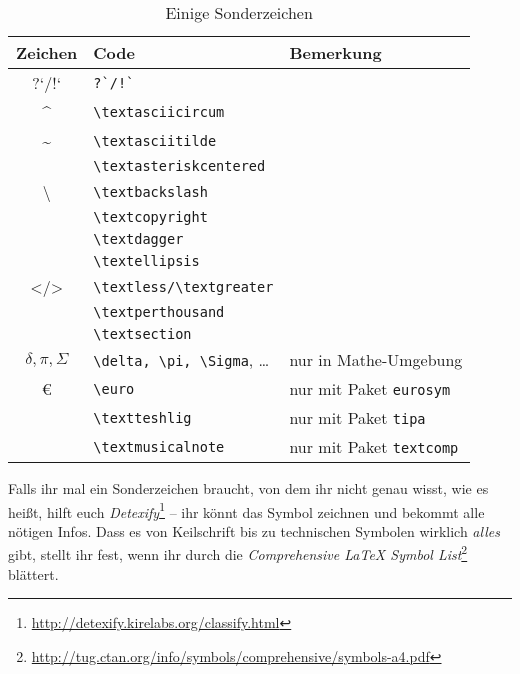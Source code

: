 \begin{table}[H]
	\center
	\begin{tabular}{cll}
		\toprule
		Zeichen & Code & Bemerkung \\
		\midrule
		?`/!` & \verb|?`/!`| & \\
		\textasciicircum & \verb|\textasciicircum| & \\
		\textasciitilde & \verb|\textasciitilde| & \\
		\textasteriskcentered & \verb|\textasteriskcentered| & \\
		\textbackslash & \verb|\textbackslash| & \\
		\textcopyright & \verb|\textcopyright| & \\
		\textdagger & \verb|\textdagger| & \\
		\textellipsis & \verb|\textellipsis| & \\
		\textless/\textgreater & \verb|\textless/\textgreater| & \\
		\textperthousand & \verb|\textperthousand| & \\
		\textsection & \verb|\textsection| & \\
		$\delta, \pi, \Sigma$ & \verb|\delta, \pi, \Sigma|, … & nur in Mathe-Umgebung \\
		\euro & \verb|\euro| & nur mit Paket \texttt{eurosym} \\
		\textteshlig & \verb|\textteshlig| & nur mit Paket \texttt{tipa} \\
		\textmusicalnote & \verb|\textmusicalnote| & nur mit Paket \texttt{textcomp} \\
		\bottomrule
	\end{tabular}
	\caption{Einige Sonderzeichen}
	\label{tbl:sonderzeichen}
\end{table}
Falls ihr mal ein Sonderzeichen braucht, von dem ihr nicht genau wisst, wie es heißt, hilft euch \emph{Detexify}\footnote{\url{http://detexify.kirelabs.org/classify.html}} – ihr könnt das Symbol zeichnen und bekommt alle nötigen Infos.
Dass es von Keilschrift bis zu technischen Symbolen wirklich \emph{alles} gibt, stellt ihr fest, wenn ihr durch die \emph{Comprehensive \LaTeX{} Symbol List}\footnote{\url{http://tug.ctan.org/info/symbols/comprehensive/symbols-a4.pdf}} blättert.

